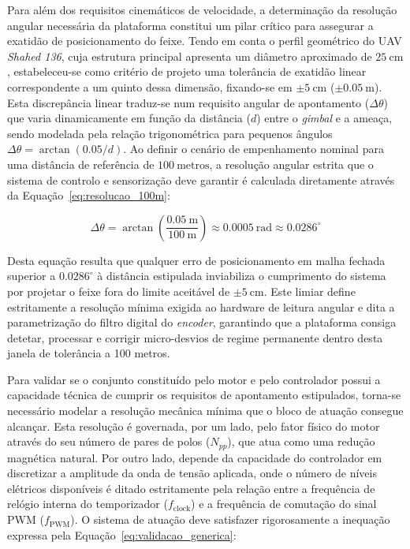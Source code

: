 Para além dos requisitos cinemáticos de velocidade, a determinação da resolução angular necessária da plataforma constitui um pilar crítico para assegurar a exatidão de posicionamento do feixe. Tendo em conta o perfil geométrico do \ac{UAV} \emph{Shahed 136}, cuja estrutura principal apresenta um diâmetro aproximado de $25~\text{cm}$ \parencite{car2023multipurpose}, estabeleceu-se como critério de projeto uma tolerância de exatidão linear correspondente a um quinto dessa dimensão, fixando-se em $\pm 5~\text{cm}$ ($\pm 0.05~\text{m}$). Esta discrepância linear traduz-se num requisito angular de apontamento ($\Delta\theta$) que varia dinamicamente em função da distância ($d$) entre o \emph{gimbal} e a ameaça, sendo modelada pela relação trigonométrica para pequenos ângulos $\Delta\theta = \arctan(0.05/d)$. Ao definir o cenário de empenhamento nominal para uma distância de referência de $100~\text{metros}$, a resolução angular estrita que o sistema de controlo e sensorização deve garantir é calculada diretamente através da Equação~\ref{eq:resolucao_100m}:

\begin{equation}
    \Delta\theta = \arctan\left(\frac{0.05~\text{m}}{100~\text{m}}\right) \approx 0.0005~\text{rad} \approx 0.0286^\circ
    \label{eq:resolucao_100m}
\end{equation}

Desta equação resulta que qualquer erro de posicionamento em malha fechada superior a $0{.}0286^\circ$ à distância estipulada inviabiliza o cumprimento do sistema por projetar o feixe fora do limite aceitável de $\pm 5~\text{cm}$. Este limiar define estritamente a resolução mínima exigida ao hardware de leitura angular e dita a parametrização do filtro digital do \emph{encoder}, garantindo que a plataforma consiga detetar, processar e corrigir micro-desvios de regime permanente dentro desta janela de tolerância a 100 metros.

Para validar se o conjunto constituído pelo motor e pelo controlador possui a capacidade técnica de cumprir os requisitos de apontamento estipulados, torna-se necessário modelar a resolução mecânica mínima que o bloco de atuação consegue alcançar. Esta resolução é governada, por um lado, pelo fator físico do motor através do seu número de pares de polos ($N_{pp}$), que atua como uma redução magnética natural. Por outro lado, depende da capacidade do controlador em discretizar a amplitude da onda de tensão aplicada, onde o número de níveis elétricos disponíveis é ditado estritamente pela relação entre a frequência de relógio interna do temporizador ($f_{\text{clock}}$) e a frequência de comutação do sinal PWM ($f_{\text{PWM}}$). O sistema de atuação deve satisfazer rigorosamente a inequação expressa pela Equação~\ref{eq:validacao_generica}:


